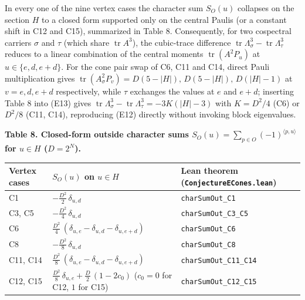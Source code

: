 \documentclass[11pt,a4paper]{article}
\begin{document}
In every one of the nine vertex cases the character sum \(S_O(u)\) collapses on the section \(H\) to a
closed form supported only on the central Paulis (or a constant shift in C12 and C15), summarized in
Table 8. Consequently, for two cospectral carriers \(\sigma\) and \(\tau\) (which share
\(\operatorname{tr}A^3\)), the cubic-trace difference \(\operatorname{tr}\Lambda_\sigma^3-\operatorname{tr}\Lambda_\tau^3\)
reduces to a linear combination of the central moments \(\operatorname{tr}(A^2P_u)\) at \(u\in\{e,d,e+d\}\).
For the cone pair swap of C6, C11 and C14, direct Pauli multiplication gives
\(\operatorname{tr}(A_\sigma^2P_v)=D(5-|H|),\,D(5-|H|),\,D(|H|-1)\) at \(v=e,d,e+d\) respectively, while
\(\tau\) exchanges the values at \(e\) and \(e+d\); inserting Table 8 into (E13) gives
\(\operatorname{tr}\Lambda_\sigma^3-\operatorname{tr}\Lambda_\tau^3=-3K(|H|-3)\) with \(K=D^2/4\) (C6) or
\(D^2/8\) (C11, C14), reproducing (E12) directly without invoking block eigenvalues.

\textbf{Table 8. Closed-form outside character sums \(S_O(u)=\sum_{p\in O}(-1)^{\langle p,u\rangle}\) for \(u\in H\) (\(D=2^N\)).}

{\def\LTcaptype{none} %
{\small
\begin{longtable}[]{@{}>{\raggedright\arraybackslash}p{}>{\raggedright\arraybackslash}p{}>{\raggedright\arraybackslash}p{}@{}}
\toprule\noalign{}
Vertex cases & \(S_O(u)\) on \(u\in H\) & Lean theorem (\nolinkurl{ConjectureECones.lean}) \\
\midrule\noalign{}
\endhead
\bottomrule\noalign{}
\endlastfoot
C1 & \(-\frac{D^2}{2}\,\delta_{u,d}\) & \texttt{charSumOut\_C1} \\
C3, C5 & \(-\frac{D^2}{4}\,\delta_{u,d}\) & \texttt{charSumOut\_C3\_C5} \\
C6 & \(\frac{D^2}{4}\,(\delta_{u,e}-\delta_{u,d}-\delta_{u,e+d})\) & \texttt{charSumOut\_C6} \\
C8 & \(-\frac{D^2}{8}\,\delta_{u,d}\) & \texttt{charSumOut\_C8} \\
C11, C14 & \(\frac{D^2}{8}\,(\delta_{u,e}-\delta_{u,d}-\delta_{u,e+d})\) & \nolinkurl{charSumOut_C11_C14} \\
C12, C15 & \(\frac{D^2}{8}\,\delta_{u,e}+\frac{D}{2}\,(1-2c_0)\) (\(c_0=0\) for C12, \(1\) for C15) & \nolinkurl{charSumOut_C12_C15} \\
\end{longtable}
}
}
\end{document}
